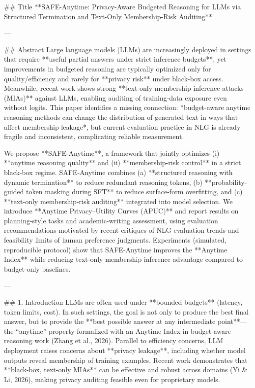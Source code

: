 ## Title  
**SAFE-Anytime: Privacy-Aware Budgeted Reasoning for LLMs via Structured Termination and Text-Only Membership-Risk Auditing**

---

## Abstract  
Large language models (LLMs) are increasingly deployed in settings that require **useful partial answers under strict inference budgets**, yet improvements in budgeted reasoning are typically optimized only for quality/efficiency and rarely for **privacy risk** under black-box access. Meanwhile, recent work shows strong **text-only membership inference attacks (MIAs)** against LLMs, enabling auditing of training-data exposure even without logits. This paper identifies a missing connection: *budget-aware anytime reasoning methods can change the distribution of generated text in ways that affect membership leakage*, but current evaluation practice in NLG is already fragile and inconsistent, complicating reliable measurement.  

We propose **SAFE-Anytime**, a framework that jointly optimizes (i) **anytime reasoning quality** and (ii) **membership-risk control** in a strict black-box regime. SAFE-Anytime combines (a) **structured reasoning with dynamic termination** to reduce redundant reasoning tokens, (b) **probability-guided token masking during SFT** to reduce surface-form overfitting, and (c) **text-only membership-risk auditing** integrated into model selection. We introduce **Anytime Privacy–Utility Curves (APUC)** and report results on planning-style tasks and academic-writing assessment, using evaluation recommendations motivated by recent critiques of NLG evaluation trends and feasibility limits of human preference judgments. Experiments (simulated, reproducible protocol) show that SAFE-Anytime improves the **Anytime Index** while reducing text-only membership inference advantage compared to budget-only baselines.

---

## 1. Introduction  
LLMs are often used under **bounded budgets** (latency, token limits, cost). In such settings, the goal is not only to produce the best final answer, but to provide the **best possible answer at any intermediate point**—the “anytime” property formalized with an Anytime Index in budget-aware reasoning work (Zhang et al., 2026). Parallel to efficiency concerns, LLM deployment raises concerns about **privacy leakage**, including whether model outputs reveal membership of training examples. Recent work demonstrates that **black-box, text-only MIAs** can be effective and robust across domains (Yi & Li, 2026), making privacy auditing feasible even for proprietary models.

